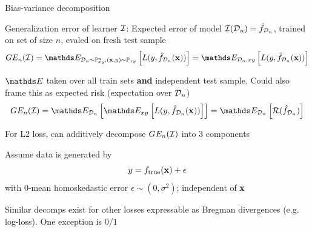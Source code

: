 \documentclass[11pt,compress,t,notes=noshow, xcolor=table]{beamer}
\begin{document}

\begin{framei}[sep=M]{Bias-variance decomposition}

\item Generalization error of learner  $\mathcal{I}$: 
Expected error of model $\mathcal{I}(\mathcal{D}_n) = \hat{f}_{\mathcal{D}_n}$, trained on set of size $n$, evaled on fresh test sample
$$
GE_n(\ind) = \E_{\D_n \sim \Pxy^n, (\xv, y) \sim \Pxy}\left[ L(y, \fh_{\D_n}(\xv)) \right] = \E_{\D_n, xy}\left[L(y, \fh_{\D_n}(\xv)) \right]  
$$

\item $\E$ taken over all train sets \textbf{and} independent test sample. Could also frame this as expected risk (expectation over $\mathcal{D}_n$)
$$GE_n(\ind) = \E_{\D_n}\left[\E_{xy}\left[ L(y, \fh_{\D_n}(\xv))\right]\right] =  \E_{\D_n}\left[\risk(\fh_{\D_n})\right]$$

\item For L2 loss, can additively decompose  $GE_n(\mathcal{I})$ into 3 components

\item Assume data is generated by 
$$
y = f_{\text{true}}(\mathbf{x}) + \epsilon
$$
with 0-mean homoskedastic error $\epsilon \sim (0, \sigma^2)$; independent of $\mathbf{x}$

\item Similar decomps exist for other losses expressable as Bregman divergences (e.g. log-loss). One exception is $0/1$ 

\end{framei}
\end{document}

